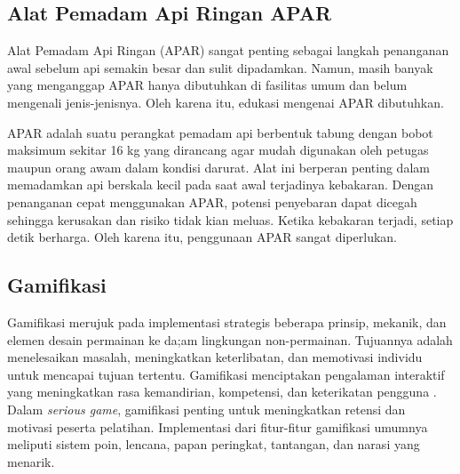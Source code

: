 \subsection{Alat Pemadam Api Ringan {APAR}}
Alat Pemadam Api Ringan (APAR) sangat penting sebagai langkah penanganan awal sebelum api semakin besar dan sulit dipadamkan. Namun, masih banyak yang menganggap APAR hanya dibutuhkan di fasilitas umum dan belum mengenali jenis-jenisnya. Oleh karena itu, edukasi mengenai APAR dibutuhkan.

APAR adalah suatu perangkat pemadam api berbentuk tabung dengan bobot maksimum sekitar 16 kg yang dirancang agar mudah digunakan oleh petugas maupun orang awam dalam kondisi darurat. Alat ini berperan penting dalam memadamkan api berskala kecil pada saat awal terjadinya kebakaran. Dengan penanganan cepat menggunakan APAR, potensi penyebaran dapat dicegah sehingga kerusakan dan risiko tidak kian meluas. Ketika kebakaran terjadi, setiap detik berharga. Oleh karena itu, penggunaan APAR sangat diperlukan. 

\subsection{Gamifikasi}
Gamifikasi merujuk pada implementasi strategis beberapa prinsip, mekanik, dan elemen desain permainan ke da;am lingkungan non-permainan. Tujuannya adalah menelesaikan masalah, meningkatkan keterlibatan, dan memotivasi individu untuk mencapai tujuan tertentu. Gamifikasi menciptakan pengalaman interaktif yang meningkatkan rasa kemandirian, kompetensi, dan keterikatan pengguna \cite{Christopoulos_Mystakidis_2023}. Dalam \textit{serious game}, gamifikasi penting untuk meningkatkan retensi dan motivasi peserta pelatihan.  Implementasi dari fitur-fitur gamifikasi umumnya meliputi sistem poin, lencana, papan peringkat, tantangan, dan narasi yang menarik. 

